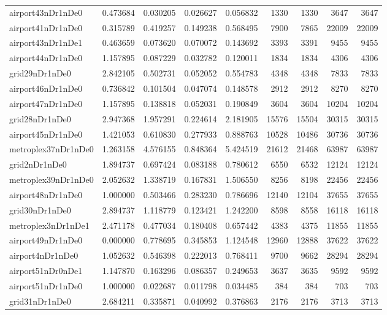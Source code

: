 \begin{longtable}{|l|r|r|r|r|r|r|r|r|}
airport43nDr1nDe0 & 0.473684 & 0.030205 & 0.026627 & 0.056832 & 1330 & 1330 & 3647 & 3647 \\
airport41nDr1nDe0 & 0.315789 & 0.419257 & 0.149238 & 0.568495 & 7900 & 7865 & 22009 & 22009 \\
airport43nDr1nDe1 & 0.463659 & 0.073620 & 0.070072 & 0.143692 & 3393 & 3391 & 9455 & 9455 \\
airport44nDr1nDe0 & 1.157895 & 0.087229 & 0.032782 & 0.120011 & 1834 & 1834 & 4306 & 4306 \\
grid29nDr1nDe0 & 2.842105 & 0.502731 & 0.052052 & 0.554783 & 4348 & 4348 & 7833 & 7833 \\
airport46nDr1nDe0 & 0.736842 & 0.101504 & 0.047074 & 0.148578 & 2912 & 2912 & 8270 & 8270 \\
airport47nDr1nDe0 & 1.157895 & 0.138818 & 0.052031 & 0.190849 & 3604 & 3604 & 10204 & 10204 \\
grid28nDr1nDe0 & 2.947368 & 1.957291 & 0.224614 & 2.181905 & 15576 & 15504 & 30315 & 30315 \\
airport45nDr1nDe0 & 1.421053 & 0.610830 & 0.277933 & 0.888763 & 10528 & 10486 & 30736 & 30736 \\
metroplex37nDr1nDe0 & 1.263158 & 4.576155 & 0.848364 & 5.424519 & 21612 & 21468 & 63987 & 63987 \\
grid2nDr1nDe0 & 1.894737 & 0.697424 & 0.083188 & 0.780612 & 6550 & 6532 & 12124 & 12124 \\
metroplex39nDr1nDe0 & 2.052632 & 1.338719 & 0.167831 & 1.506550 & 8256 & 8198 & 22456 & 22456 \\
airport48nDr1nDe0 & 1.000000 & 0.503466 & 0.283230 & 0.786696 & 12140 & 12104 & 37655 & 37655 \\
grid30nDr1nDe0 & 2.894737 & 1.118779 & 0.123421 & 1.242200 & 8598 & 8558 & 16118 & 16118 \\
metroplex3nDr1nDe1 & 2.471178 & 0.477034 & 0.180408 & 0.657442 & 4383 & 4375 & 11855 & 11855 \\
airport49nDr1nDe0 & 0.000000 & 0.778695 & 0.345853 & 1.124548 & 12960 & 12888 & 37622 & 37622 \\
airport4nDr1nDe0 & 1.052632 & 0.546398 & 0.222013 & 0.768411 & 9700 & 9662 & 28294 & 28294 \\
airport51nDr0nDe1 & 1.147870 & 0.163296 & 0.086357 & 0.249653 & 3637 & 3635 & 9592 & 9592 \\
airport51nDr1nDe0 & 1.000000 & 0.022687 & 0.011798 & 0.034485 & 384 & 384 & 703 & 703 \\
grid31nDr1nDe0 & 2.684211 & 0.335871 & 0.040992 & 0.376863 & 2176 & 2176 & 3713 & 3713 \\

\end{longtable}
